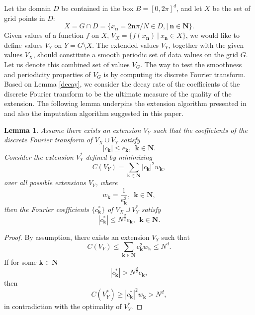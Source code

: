 \documentclass[11pt,oneside,reqno]{amsart}
\theoremstyle{plain}
\newtheorem{lemma}[theorem]{Lemma}
\numberwithin{equation}{section}
\begin{document}
\medskip
Let the domain $D$ be contained in the box $B=[0,2\pi]^d$, and let $X$ be the set of grid points in $D$:
$$X=G\cap D=\{x_\mathbf{n}=2\mathbf{n}\pi/N\in D, |\ \mathbf{n}\in \mathbf{N}\}.$$ Given values of a function $f$ on $X$,
$V_X=\{f(x_\mathbf{n})\ |\ x_\mathbf{n}\in X\}$, we would like to define values $V_Y$ on $Y=G\setminus X$. The extended values $V_Y$, together with the given values
$V_X$, should constitute a smooth periodic set of data values on the grid $G$. Let us denote this combined set of values $V_G$. The way to test
the smoothness and periodicity properties of $V_G$ is by computing
its discrete Fourier transform.
Based on Lemma \ref{decay}, we consider the decay rate of the coefficients of the discrete Fourier transform to be the ultimate measure of the
quality of the extension. The following lemma underpins the extension algorithm presented in \cite{GL10} and also the imputation algorithm suggested in this paper.

\begin{lemma}\label{main}
Assume there exists an extension $V_Y$ such that the coefficients of the discrete Fourier transform of $V_X\cup V_Y$ satisfy
\begin{equation}\label{leek}
|c_{\mathbf{k}}|\le e_{\mathbf{k}},\ \ \mathbf{k}\in\mathbf{N}.
\end{equation}
Consider the extension $V^*_Y$ defined by minimizing
\begin{equation}\label{cost1}
C(V_Y)=\sum_{\mathbf{k}\in\mathbf{N}}|c_{\mathbf{k}}|^2w_{\mathbf{k}},
\end{equation}
over all possible extensions $V_Y$, where
\begin{equation}\label{wk1}
w_{\mathbf{k}}=\frac{1}{e^2_{\mathbf{k}}},\ \ \mathbf{k}\in\mathbf{N},
\end{equation}
then the Fourier coefficients $\{c^*_{\mathbf{k}}\}$ of $V_X\cup V^*_Y$ satisfy
\begin{equation}\label{leek2}
|c^*_{\mathbf{k}}|\le N^{\frac{d}{2}}e_{\mathbf{k}},\ \ \mathbf{k}\in\mathbf{N}.
\end{equation}

\end{lemma}
\begin{proof}
By assumption, there exists an extension $V_Y$ such that
$$C(V_Y)\le \sum_{\mathbf{k}\in\mathbf{N}}e_{\mathbf{k}}^2w_{\mathbf{k}}\le N^d.$$
If for some $\mathbf{k}\in\mathbf{N}$
$$|c^*_{\mathbf{k}}|> N^{\frac{d}{2}}e_{\mathbf{k}},$$
then
$$C(V^*_Y)\ge |c^*_{\mathbf{k}}|^2w_{\mathbf{k}}>N^d,$$
in contradiction with the optimality of $V^*_Y$.
\end{proof}
\end{document}
